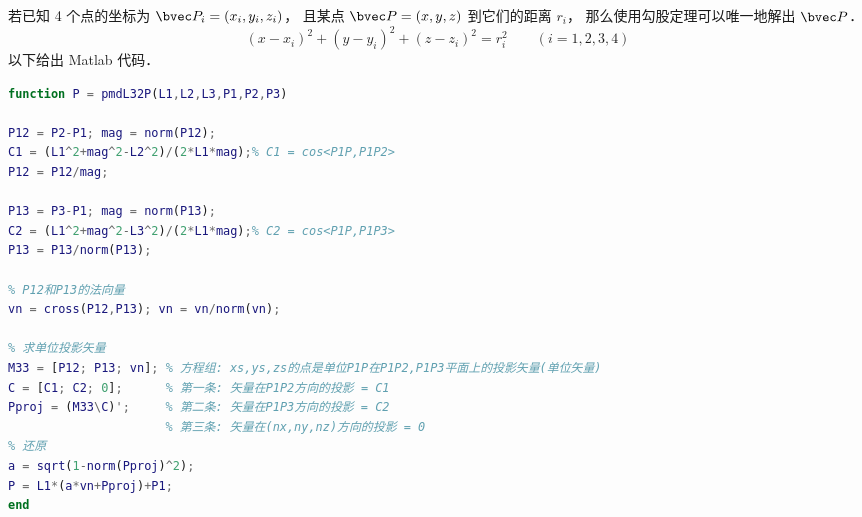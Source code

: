
\begin{issues}
\issueDraft
\end{issues}

若已知 4 个点的坐标为 $\bvec P_i = (x_i,y_i,z_i)$， 且某点 $\bvec P = (x,y,z)$ 到它们的距离 $r_i$， 那么使用勾股定理可以唯一地解出 $\bvec P$．
\begin{equation}
(x-x_i)^2 + (y-y_i)^2 + (z-z_i)^2 = r_i^2 \qquad (i = 1,2,3,4)
\end{equation}
以下给出 Matlab 代码．

\begin{lstlisting}[language=matlab]
% 已知三棱锥底面的三个点坐标 P1,P2,P3, 和三条棱 L1,L2,L3, 求顶点坐标
function P = pmdL32P(L1,L2,L3,P1,P2,P3)

P12 = P2-P1; mag = norm(P12);
C1 = (L1^2+mag^2-L2^2)/(2*L1*mag);% C1 = cos<P1P,P1P2>
P12 = P12/mag;

P13 = P3-P1; mag = norm(P13);
C2 = (L1^2+mag^2-L3^2)/(2*L1*mag);% C2 = cos<P1P,P1P3>
P13 = P13/norm(P13);

% P12和P13的法向量
vn = cross(P12,P13); vn = vn/norm(vn);

% 求单位投影矢量
M33 = [P12; P13; vn]; % 方程组: xs,ys,zs的点是单位P1P在P1P2,P1P3平面上的投影矢量(单位矢量)
C = [C1; C2; 0];      % 第一条: 矢量在P1P2方向的投影 = C1
Pproj = (M33\C)';     % 第二条: 矢量在P1P3方向的投影 = C2
                      % 第三条: 矢量在(nx,ny,nz)方向的投影 = 0
% 还原
a = sqrt(1-norm(Pproj)^2);
P = L1*(a*vn+Pproj)+P1;
end
\end{lstlisting}

